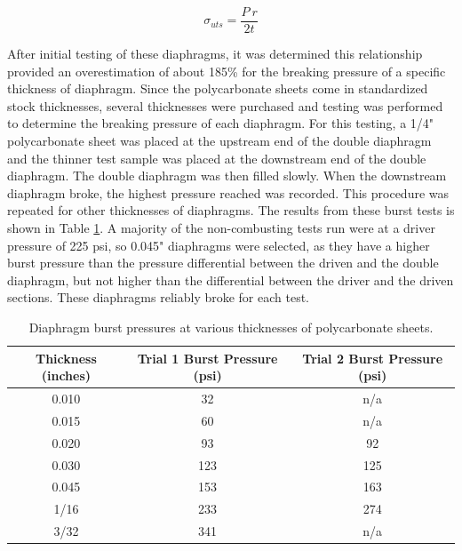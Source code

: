 \begin{equation}
\sigma_{uts} = \frac{P~r}{2t}
\label{eq:spherePV}
\end{equation}

After initial testing of these diaphragms, it was determined this relationship provided an overestimation of about 185\% for the breaking pressure of a specific thickness of diaphragm. Since the polycarbonate sheets come in standardized stock thicknesses, several thicknesses were purchased and testing was performed to determine the breaking pressure of each diaphragm. For this testing, a 1/4" polycarbonate sheet was placed at the upstream end of the double diaphragm and the thinner test sample was placed at the downstream end of the double diaphragm. The double diaphragm was then filled slowly. When the downstream diaphragm broke, the highest pressure reached was recorded. This procedure was repeated for other thicknesses of diaphragms. The results from these burst tests is shown in Table \ref{Table:Burst}. A majority of the non-combusting tests run were at a driver pressure of 225 psi, so 0.045" diaphragms were selected, as they have a higher burst pressure than the pressure differential between the driven and the double diaphragm, but not higher than the differential between the driver and the driven sections. These diaphragms reliably broke for each test.

\begin{table}
\centering
\begin{tabular}{|c|c|c|}
\hline
\hline
Thickness (inches) & Trial 1 Burst Pressure (psi) & Trial 2 Burst Pressure (psi)\\ 
\hline \hline
0.010 & 32 & n/a \\

0.015 & 60 & n/a \\

0.020 & 93 & 92 \\

0.030 & 123 & 125 \\

0.045 & 153 & 163 \\

1/16 & 233 & 274 \\

3/32 & 341 & n/a \\

\hline \hline

\end{tabular}
\caption[Diaphragm Burst Pressures]{Diaphragm burst pressures at various thicknesses of polycarbonate sheets.}
\label{Table:Burst}
\end{table}

